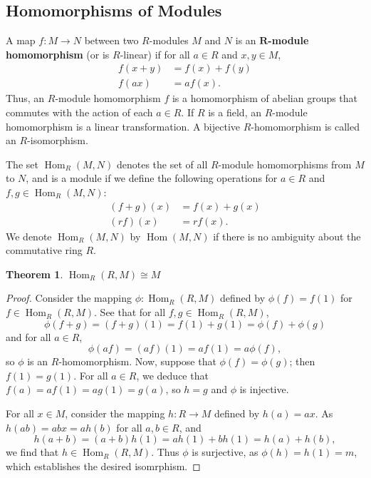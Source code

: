 \documentclass[11pt]{article}
\newtheorem{theorem}{Theorem}
\newcommand{\Hom}{\operatorname{Hom}}
\begin{document}

\subsection{Homomorphisms of Modules}

A map $f: M \to N$ between two $R$-modules $M$ and $N$ is an $\mathbf{R}$\textbf{-module homomorphism} (or is $R$-linear) if for all $a \in R$ and $x, y \in M$,
\begin{align*}
	f(x + y) & = f(x) + f(y) \\
	f(ax)    & = a f(x).
\end{align*}
Thus, an $R$-module homomorphism $f$ is a homomorphism of abelian groups that commutes with the action of each $a \in R$. If $R$ is a field, an $R$-module homomorphism is a linear transformation. A bijective $R$-homomorphism is called an $R$-isomorphism.

\newpage

The set $\Hom_{R}(M, N)$ denotes the set of all $R$-module homomorphisms from $M$ to $N$, and is a module if we define the following operations for $a \in R$ and $f, g \in \Hom_{R}(M, N)$:
\begin{align*}
	(f + g)(x) & = f(x) + g(x) \\
	(rf)(x)    & = r f(x).
\end{align*}
We denote $\Hom_{R}(M, N)$ by $\Hom(M, N)$ if there is no ambiguity about the commutative ring $R$.

\begin{adjustwidth}{1cm}{}
	\begin{theorem}
		$\Hom_{R}(R, M) \cong M$
	\end{theorem}
	\begin{proof}
		Consider the mapping $\phi : \Hom_{R}(R, M)$ defined by $\phi(f) = f(1)$ for $f \in \Hom_{R}(R, M)$. See that for all $f, g \in \Hom_{R}(R, M)$,
		\[
			\phi(f + g) = (f + g)(1) = f(1) + g(1) = \phi(f) + \phi(g)
		\]
		and for all $a \in R$,
		\[
			\phi(af) = (af)(1) = a f(1) = a \phi(f),
		\]
		so $\phi$ is an $R$-homomorphism. Now, suppose that $\phi(f) = \phi(g)$; then $f(1) = g(1)$. For all $a \in R$, we deduce that $f(a) = a f(1) = a g(1) = g(a)$, so $h = g$ and $\phi$ is injective.

		For all $x \in M$, consider the mapping $h : R \to M$ defined by $h(a) = ax$. As $h(ab) = abx = a h(b)$ for all $a, b \in R$, and
		\[
			h(a + b) = (a + b) h(1) = a h(1) + b h(1) = h(a) + h(b),
		\]
		we find that $h \in \Hom_{R}(R, M)$. Thus $\phi$ is surjective, as $\phi(h) = h(1) = m$, which establishes the desired isomrphism.
	\end{proof}
\end{adjustwidth}
\end{document}
